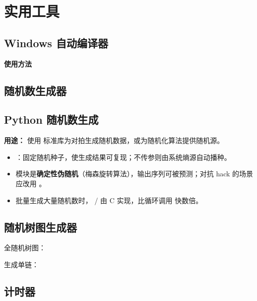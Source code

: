 \section{实用工具}

\subsection{Windows 自动编译器}



\textbf{使用方法}


\subsection{随机数生成器}



\subsection{Python 随机数生成}

\textbf{用途：} 使用  标准库为对拍生成随机数据，或为随机化算法提供随机源。

\begin{itemize}
  \item {}：固定随机种子，使生成结果可复现；不传参则由系统熵源自动播种。
  \item {} 模块是\textbf{确定性伪随机}（梅森旋转算法），输出序列可被预测；对抗 hack 的场景应改用 。
  \item 批量生成大量随机数时， /  由 C 实现，比循环调用  快数倍。
\end{itemize}



\subsection{随机树图生成器}

全随机树图：


生成单链：


\subsection{计时器}

